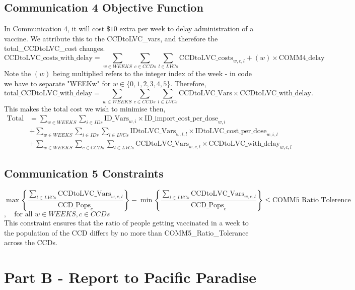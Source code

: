 \documentclass[12pt]{article}
\begin{document}
    \subsection{Communication 4 Objective Function}
        In Communication 4, it will cost \(\$10\) extra per week to delay administration of a vaccine. We attribute this to the CCDtoLVC\_vars, and therefore the total\_CCDtoLVC\_cost changes. 
        \[\text{CCDtoLVC\_costs\_with\_delay} = \sum_{w\in WEEKS}\sum_{c\in CCDs}\sum_{l\in LVCs}\text{CCDtoLVC\_costs}_{w,c,l} + (w)\times \text{COMM4\_delay}\]
        Note the \((w)\) being multiplied refers to the integer index of the week - in code we have to separate "WEEKw" for \(w \in \{0,1,2,3,4,5\}\). Therefore,
        \[\text{total\_CCDtoLVC\_with\_delay} = \sum_{w\in WEEKS}\sum_{c\in CCDs}\sum_{l\in LVCs} \text{CCDtoLVC\_Vars} \times \text{CCDtoLVC\_with\_delay}.\]
        This makes the total cost we wish to minimise then,
        \begin{align*}
            \text{Total Cost} &= \sum_{w \in WEEKS}\sum_{i\in IDs}\text{ID\_Vars}_{w,i}\times \text{ID\_import\_cost\_per\_dose}_{w,i}\\
            &+ \sum_{w\in WEEKS}\sum_{i\in IDs}\sum_{l\in LVCs}\text{IDtoLVC\_Vars}_{w,i,l}\times \text{IDtoLVC\_cost\_per\_dose}_{w,i,l}\\
            &+ \sum_{w\in WEEKS}\sum_{c\in CCDs}\sum_{l\in LVCs} \text{CCDtoLVC\_Vars}_{w,c,l} \times \text{CCDtoLVC\_with\_delay}_{w,c,l}
        \end{align*}
    \subsection{Communication 5 Constraints}
        \[\max\left\{\frac{\displaystyle\sum_{l\in LVCs}\text{CCDtoLVC\_Vars}_{w,c,l}}{\text{CCD\_Pops}_{c}}\right\} - \min\left\{\frac{\displaystyle\sum_{l\in LVCs}\text{CCDtoLVC\_Vars}_{w,c,l}}{\text{CCD\_Pops}_{c}}\right\} \le \text{COMM5\_Ratio\_Tolerence}\]
        \(, \quad \text{for all } w\in WEEKS, c\in CCDs\)\\

        This constraint ensures that the ratio of people getting vaccinated in a week to the population of the CCD differs by no more than COMM5\_Ratio\_Tolerance across the CCDs.
    \section{Part B - Report to Pacific Paradise}
\end{document}
